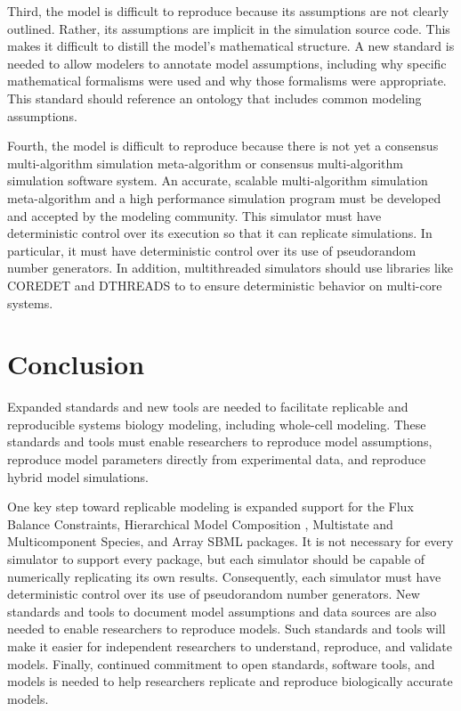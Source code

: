 \documentclass[journal,transmag,twoside]{IEEEtran}
\begin{document}
Third, the model is difficult to reproduce because its assumptions are not clearly outlined. Rather, its assumptions are
implicit in the simulation source code. This makes it difficult
to distill the model's mathematical structure. A new standard is needed to allow modelers to annotate model assumptions, including why
specific mathematical formalisms were used and why those formalisms were appropriate. This standard should reference an ontology that 
includes common modeling assumptions.

Fourth, the model is difficult to reproduce because there is not yet a consensus multi-algorithm simulation meta-algorithm 
or consensus multi-algorithm simulation software system. An accurate, scalable multi-algorithm simulation meta-algorithm
and a high performance simulation program must be developed and accepted by the modeling community. This 
simulator must have deterministic control over its execution so that it can replicate 
simulations. In particular, it must have deterministic control over its use of pseudorandom number generators. 
In addition, multithreaded simulators should use libraries like C{\small ORE}D{\small ET} and D{\small THREADS} to 
to ensure deterministic behavior on multi-core systems.

\section{Conclusion}

Expanded standards and new tools are needed to facilitate replicable and reproducible systems biology modeling, including whole-cell modeling.
These standards and tools must enable researchers to reproduce model assumptions, reproduce model parameters
directly from experimental data, and reproduce hybrid model simulations. 

One key step toward replicable modeling is expanded support for the 
Flux Balance Constraints, Hierarchical Model Composition \cite{smith2015sbml}, Multistate and Multicomponent
Species, and Array SBML packages. It is not necessary for every simulator
to support every package, but each simulator should be capable of numerically replicating its own results.
Consequently, each simulator must have deterministic control over its use of pseudorandom number generators.
New standards and tools to document model assumptions and data sources are also needed to enable researchers to reproduce models.
Such standards and tools will make it easier for independent researchers to understand, reproduce, and validate models. 
Finally, continued commitment to open standards, software tools, and models is needed to help researchers replicate and reproduce biologically accurate models.
\end{document}
